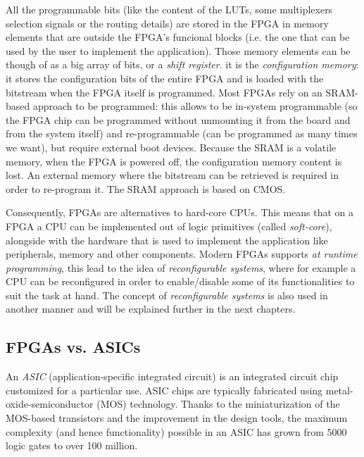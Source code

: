 All the programmable bits (like the content of the LUTs, some multiplexers selection signals or the routing details) are stored in the FPGA in memory elements that are outside the FPGA's funcional blocks (i.e. the one that can be used by the user to implement the application). Those memory elements can be though of as a big array of bits, or a \textit{shift register}. it is the \textit{configuration memory}: it stores the configuration bits of the entire FPGA and is loaded with the bitstream when the FPGA itself is programmed. Most FPGAs rely on an SRAM-based approach to be programmed: this allows to be in-system programmable (so the FPGA chip can be programmed without unmounting it from the board and from the system itself) and re-programmable (can be programmed as many times we want), but require external boot devices. Because the SRAM is a volatile memory, when the FPGA is powered off, the configuration memory content is lost. An external memory where the bitstream can be retrieved is required in order to re-program it. The SRAM approach is based on CMOS.\bigskip

Consequently, FPGAs are alternatives to hard-core CPUs. This means that on a FPGA a CPU can be implemented out of logic primitives (called \textit{soft-core}), alongside with the hardware that is used to implement the application like peripherals, memory and other components. Modern FPGAs supports \textit{at runtime programming}, this lead to the idea of \textit{reconfigurable systems}, where for example a CPU can be reconfigured in order to enable/disable some of its functionalities to suit the task at hand. The concept of \textit{reconfigurable systems} is also used in another manner and will be explained further in the next chapters.

\subsection{FPGAs vs. ASICs}

An \textit{ASIC} (application-specific integrated circuit) is an integrated circuit chip customized for a particular use. ASIC chips are typically fabricated using metal-oxide-semiconductor (MOS) technology. Thanks to the miniaturization of the MOS-based transistors and the improvement in the design tools, the maximum complexity (and hence functionality) possible in an ASIC has grown from 5000 logic gates to over 100 million. \bigskip

